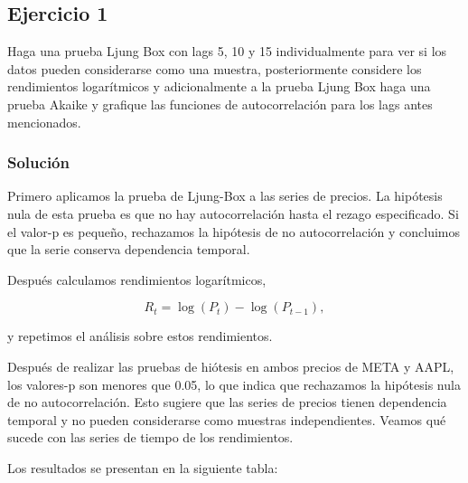\documentclass[
]{article}
\begin{document}
\subsection{Ejercicio 1}\label{ejercicio-1}

Haga una prueba Ljung Box con lags 5, 10 y 15 individualmente para ver
si los datos pueden considerarse como una muestra, posteriormente
considere los rendimientos logarítmicos y adicionalmente a la prueba
Ljung Box haga una prueba Akaike y grafique las funciones de
autocorrelación para los lags antes mencionados.

\subsubsection{Solución}\label{soluciuxf3n}

Primero aplicamos la prueba de Ljung-Box a las series de precios. La
hipótesis nula de esta prueba es que no hay autocorrelación hasta el
rezago especificado. Si el valor-p es pequeño, rechazamos la hipótesis
de no autocorrelación y concluimos que la serie conserva dependencia
temporal.

Después calculamos rendimientos logarítmicos,

\[
R_t = \log(P_t)-\log(P_{t-1}),
\]

y repetimos el análisis sobre estos rendimientos.

Después de realizar las pruebas de hiótesis en ambos precios de META y
AAPL, los valores-p son menores que 0.05, lo que indica que rechazamos
la hipótesis nula de no autocorrelación. Esto sugiere que las series de
precios tienen dependencia temporal y no pueden considerarse como
muestras independientes. Veamos qué sucede con las series de tiempo de
los rendimientos.

Los resultados se presentan en la siguiente tabla:
\end{document}
